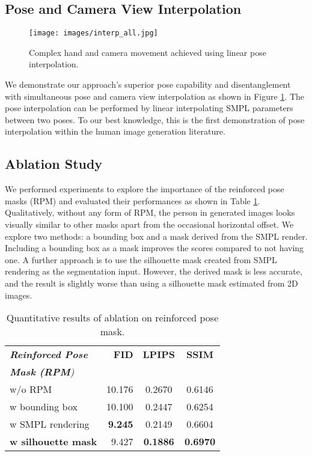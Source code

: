 \documentclass[10pt,twocolumn,letterpaper]{article}
\begin{document}
\subsection{Pose and Camera View Interpolation}
\vspace{-4mm}
\begin{figure}[!ht]
\centering
    \texttt{[image: images/interp\_all.jpg]}
\caption{Complex hand and camera movement achieved using linear pose interpolation.}
\label{fig:interpolation}
\end{figure}
We demonstrate  our approach's superior pose capability and disentanglement with simultaneous pose and camera view interpolation as shown in Figure \ref{fig:interpolation}. The pose interpolation can be performed by linear interpolating SMPL parameters between two poses. To our best knowledge, this is the first demonstration of pose interpolation within the human image generation literature. 

\subsection{Ablation Study}\label{sec:ablation}
We performed experiments to explore the importance of the reinforced pose masks (RPM) and evaluated their performances as shown in Table \ref{table:ablation}. Qualitatively, without any form of RPM, the person in generated images looks visually similar to other masks apart from the occasional horizontal offset. We explore two methods: a bounding box and a mask derived from the SMPL render. Including a bounding box as a mask improves the scores compared to not having one. A further approach is to use the silhouette mask created from SMPL rendering as the segmentation input. However, the derived mask is less accurate, and the result is slightly worse than using a silhouette mask estimated from 2D images. 

\begin{table}[h]
\centering
\begin{tabular}{l|r|c|c} 
\toprule
\textit{\textbf{Reinforced Pose }} &  \textbf{FID} & \textbf{LPIPS} & \textbf{SSIM}   \\ 
\textit{\textbf{ Mask (RPM})} & & & \\
\toprule
  w/o RPM & 10.176 & 0.2670 & 0.6146 \\
w bounding box & 10.100 & 0.2447 & 0.6254 \\
 w SMPL rendering & \textbf{9.245} & 0.2149 & 0.6604   \\
  \textbf{w silhouette mask} & 9.427 & \textbf{0.1886} & \textbf{0.6970} \\
\bottomrule
\end{tabular}

\caption{Quantitative results of ablation on reinforced pose mask.}
\label{table:ablation}

\end{table}
\end{document}
